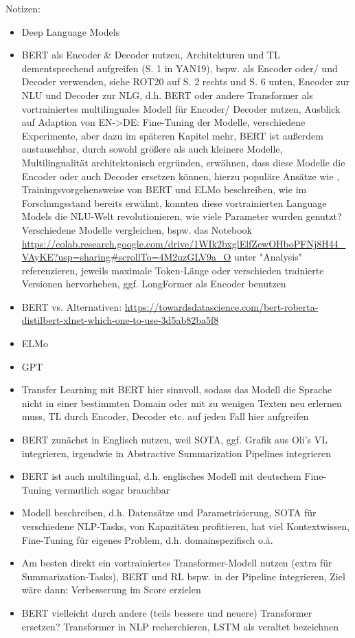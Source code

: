 Notizen:
\begin{itemize}
	\item Deep Language Models
	\item BERT als Encoder \& Decoder nutzen, Architekturen und TL dementsprechend aufgreifen (S. 1 in YAN19), bspw. als Encoder oder/ und Decoder verwenden, siehe ROT20 auf S. 2 rechts und S. 6 unten, Encoder zur NLU und Decoder zur NLG, d.h. BERT oder andere Transformer als vortrainiertes multilinguales Modell für Encoder/ Decoder nutzen, Ausblick auf Adaption von EN->DE: Fine-Tuning der Modelle, verschiedene Experimente, aber dazu im späteren Kapitel mehr, BERT ist außerdem austauschbar, durch sowohl größere als auch kleinere Modelle, Multilingualität architektonisch ergründen, erwähnen, dass diese Modelle die Encoder oder auch Decoder ersetzen können, hierzu populäre Ansätze wie \cite{ROT20}, Trainingsvorgehensweise von BERT und ELMo beschreiben, wie im Forschungsstand bereits erwähnt, konnten diese vortrainierten Language Models die NLU-Welt revolutionieren, wie viele Parameter wurden genutzt? Verschiedene Modelle vergleichen, bspw. das Notebook \url{https://colab.research.google.com/drive/1WIk2bxglElfZewOHboPFNj8H44_VAyKE?usp=sharing#scrollTo=4M2uzGLV9a_O} unter "Analysis" referenzieren, jeweils maximale Token-Länge oder verschieden trainierte Versionen hervorheben, ggf. LongFormer als Encoder benutzen
	\item BERT vs. Alternativen: \url{https://towardsdatascience.com/bert-roberta-distilbert-xlnet-which-one-to-use-3d5ab82ba5f8}
	\item ELMo
	\item GPT
	\item Transfer Learning mit BERT hier sinnvoll, sodass das Modell die Sprache nicht in einer bestimmten Domain oder mit zu wenigen Texten neu erlernen muss, TL durch Encoder, Decoder etc. auf jeden Fall hier aufgreifen
	\item BERT zunächst in Englisch nutzen, weil SOTA, ggf. Grafik aus Oli's VL integrieren, irgendwie in Abstractive Summarization Pipelines integrieren
	\item BERT ist auch multilingual, d.h. englisches Modell mit deutschem Fine-Tuning vermutlich sogar brauchbar
	\item Modell beschreiben, d.h. Datensätze und Parametrisierung, SOTA für verschiedene NLP-Tasks, von Kapazitäten profitieren, hat viel Kontextwissen, Fine-Tuning für eigenes Problem, d.h. domainspezifisch o.ä.
	\item Am besten direkt ein vortrainiertes Transformer-Modell nutzen (extra für Summarization-Tasks), BERT und RL bspw. in der Pipeline integrieren, Ziel wäre dann: Verbesserung im Score erzielen
	\item BERT vielleicht durch andere (teils bessere und neuere) Transformer ersetzen? Transformer in NLP recherchieren, LSTM als veraltet bezeichnen
\end{itemize}

